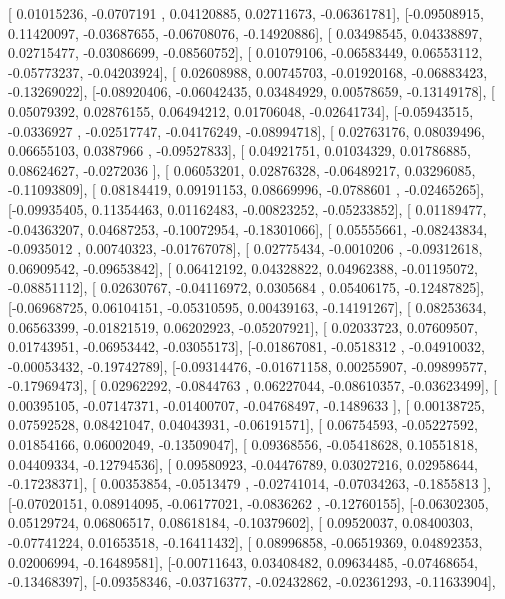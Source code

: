 \documentclass{article}
\begin{document}
       [ 0.01015236, -0.0707191 ,  0.04120885,  0.02711673, -0.06361781],
       [-0.09508915,  0.11420097, -0.03687655, -0.06708076, -0.14920886],
       [ 0.03498545,  0.04338897,  0.02715477, -0.03086699, -0.08560752],
       [ 0.01079106, -0.06583449,  0.06553112, -0.05773237, -0.04203924],
       [ 0.02608988,  0.00745703, -0.01920168, -0.06883423, -0.13269022],
       [-0.08920406, -0.06042435,  0.03484929,  0.00578659, -0.13149178],
       [ 0.05079392,  0.02876155,  0.06494212,  0.01706048, -0.02641734],
       [-0.05943515, -0.0336927 , -0.02517747, -0.04176249, -0.08994718],
       [ 0.02763176,  0.08039496,  0.06655103,  0.0387966 , -0.09527833],
       [ 0.04921751,  0.01034329,  0.01786885,  0.08624627, -0.0272036 ],
       [ 0.06053201,  0.02876328, -0.06489217,  0.03296085, -0.11093809],
       [ 0.08184419,  0.09191153,  0.08669996, -0.0788601 , -0.02465265],
       [-0.09935405,  0.11354463,  0.01162483, -0.00823252, -0.05233852],
       [ 0.01189477, -0.04363207,  0.04687253, -0.10072954, -0.18301066],
       [ 0.05555661, -0.08243834, -0.0935012 ,  0.00740323, -0.01767078],
       [ 0.02775434, -0.0010206 , -0.09312618,  0.06909542, -0.09653842],
       [ 0.06412192,  0.04328822,  0.04962388, -0.01195072, -0.08851112],
       [ 0.02630767, -0.04116972,  0.0305684 ,  0.05406175, -0.12487825],
       [-0.06968725,  0.06104151, -0.05310595,  0.00439163, -0.14191267],
       [ 0.08253634,  0.06563399, -0.01821519,  0.06202923, -0.05207921],
       [ 0.02033723,  0.07609507,  0.01743951, -0.06953442, -0.03055173],
       [-0.01867081, -0.0518312 , -0.04910032, -0.00053432, -0.19742789],
       [-0.09314476, -0.01671158,  0.00255907, -0.09899577, -0.17969473],
       [ 0.02962292, -0.0844763 ,  0.06227044, -0.08610357, -0.03623499],
       [ 0.00395105, -0.07147371, -0.01400707, -0.04768497, -0.1489633 ],
       [ 0.00138725,  0.07592528,  0.08421047,  0.04043931, -0.06191571],
       [ 0.06754593, -0.05227592,  0.01854166,  0.06002049, -0.13509047],
       [ 0.09368556, -0.05418628,  0.10551818,  0.04409334, -0.12794536],
       [ 0.09580923, -0.04476789,  0.03027216,  0.02958644, -0.17238371],
       [ 0.00353854, -0.0513479 , -0.02741014, -0.07034263, -0.1855813 ],
       [-0.07020151,  0.08914095, -0.06177021, -0.0836262 , -0.12760155],
       [-0.06302305,  0.05129724,  0.06806517,  0.08618184, -0.10379602],
       [ 0.09520037,  0.08400303, -0.07741224,  0.01653518, -0.16411432],
       [ 0.08996858, -0.06519369,  0.04892353,  0.02006994, -0.16489581],
       [-0.00711643,  0.03408482,  0.09634485, -0.07468654, -0.13468397],
       [-0.09358346, -0.03716377, -0.02432862, -0.02361293, -0.11633904],
\end{document}
